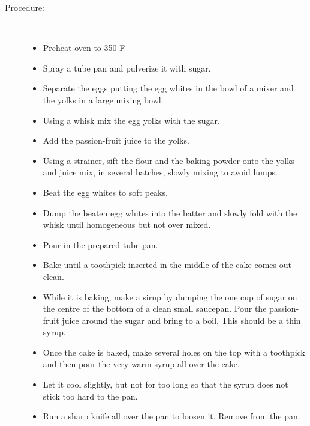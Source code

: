 \documentclass[11pt,letterpaper]{article}
\begin{document}
\begin{description}
\item[Procedure:]\ \\
	\begin{itemize}
	\item Preheat oven to 350 F
	\item Spray a tube pan and pulverize it with sugar.
	\item Separate the eggs putting the egg whites in the bowl of a mixer and the yolks in a large mixing bowl.
	\item Using a whisk mix the egg yolks with the sugar.
	\item Add the passion-fruit juice to the yolks.
	\item Using a strainer, sift the flour and the baking powder onto the yolks and juice mix, in several batches, slowly mixing to avoid lumps. 
	\item Beat the egg whites to soft peaks.
	\item Dump the beaten egg whites into the batter and slowly fold with the whisk until homogeneous but not over mixed.
	 \item Pour in the prepared tube pan. 
	\item Bake until a toothpick inserted in the middle of the cake comes out clean.
	\item While it is baking, make a sirup by dumping the one cup of sugar on the centre of the bottom of a clean small saucepan. Pour the passion-fruit juice around the sugar and bring to a boil. This should be a thin syrup.
	\item Once the cake is baked, make several holes on the top with a toothpick and then pour the very warm syrup all over the cake.
	\item Let it cool slightly, but not for too long so that the syrup does not stick too hard to the pan.
	\item Run a sharp knife all over the pan to loosen it. Remove from the pan. 
	\end{itemize}
\end{description}
\end{document}
